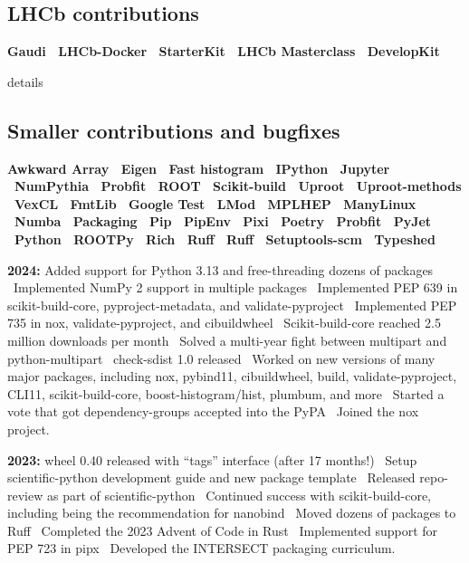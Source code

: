 \documentclass[10pt,letterpaper]{moderncv}
\begin{document}
\subsection{LHCb contributions}
\textbf{%
	Gaudi \textbullet\
	LHCb-Docker \textbullet\
	StarterKit \textbullet\
	LHCb Masterclass \textbullet\
	DevelopKit
}


\begin{taggedblock}{details}
\subsection{Smaller contributions and bugfixes}
\textbf{%
	Awkward Array \textbullet\
	Eigen \textbullet\
	Fast histogram \textbullet\
	IPython \textbullet\
	Jupyter \textbullet\
	NumPythia \textbullet\
	Probfit \textbullet\
	ROOT \textbullet\
	Scikit-build \textbullet\
	Uproot \textbullet\
	Uproot-methods \textbullet\
	VexCL \textbullet\
    FmtLib \textbullet\
    Google Test \textbullet\
    LMod \textbullet\
    MPLHEP \textbullet\
    ManyLinux \textbullet\
    Numba \textbullet\
    Packaging \textbullet\
    Pip \textbullet\
    PipEnv \textbullet\
    Pixi \textbullet\
    Poetry \textbullet\
    Probfit \textbullet\
    PyJet \textbullet\
    Python \textbullet\
    ROOTPy \textbullet\
    Rich \textbullet\
    Ruff \textbullet\
    Ruff \textbullet\
    Setuptools-scm \textbullet\
    Typeshed
}
\end{taggedblock}



\textbf{2024:}
Added support for Python 3.13 and free-threading dozens of packages \textbullet\
Implemented NumPy 2 support in multiple packages \textbullet\
Implemented PEP 639 in scikit-build-core, pyproject-metadata, and validate-pyproject \textbullet\
Implemented PEP 735 in nox, validate-pyproject, and cibuildwheel \textbullet\
Scikit-build-core reached 2.5 million downloads per month \textbullet\
Solved a multi-year fight between multipart and python-multipart \textbullet\
check-sdist 1.0 released \textbullet\
Worked on new versions of many major packages, including nox, pybind11,
cibuildwheel, build, validate-pyproject, CLI11, scikit-build-core, boost-histogram/hist,
plumbum, and more \textbullet\
Started a vote that got dependency-groups accepted into the PyPA \textbullet\
Joined the nox project.

\textbf{2023:}
wheel 0.40 released with ``tags'' interface (after 17 months!) \textbullet\
Setup scientific-python development guide and new package template \textbullet\
Released repo-review as part of scientific-python \textbullet\
Continued success with scikit-build-core, including being the recommendation for nanobind \textbullet\
Moved dozens of packages to Ruff \textbullet\
Completed the 2023 Advent of Code in Rust \textbullet\
Implemented support for PEP 723 in pipx \textbullet\
Developed the INTERSECT packaging curriculum.
\end{document}
